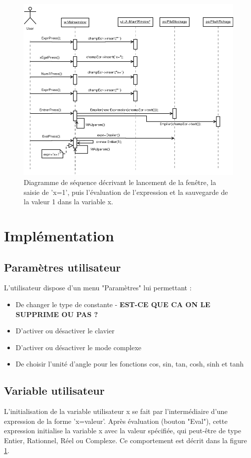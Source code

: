 \documentclass[a4paper,11pt]{article}
\begin{document}
\begin{figure}[H]
	\center
	\includegraphics[width=16.7cm]{diag_seq_2.png}
	\caption{Diagramme de séquence décrivant le lancement de la fenêtre, la saisie de 'x=1', puis l'évaluation de l'expression et la sauvegarde de la valeur 1 dans la variable x.}
	\label{Diagramme sequence x}
\end{figure}

\section{Implémentation}
\subsection{Paramètres utilisateur}
L'utilisateur dispose d'un menu "Paramètres" lui permettant :
\begin{itemize}
\item{De changer le type de constante - \textbf{EST-CE QUE CA ON LE SUPPRIME OU PAS ?}}
\item{D'activer ou désactiver le clavier}
\item{D'activer ou désactiver le mode complexe}
\item{De choisir l'unité d'angle pour les fonctions cos, sin, tan, cosh, sinh et tanh}
\end{itemize}

\subsection{Variable utilisateur}
L'initialisation de la variable utilisateur x se fait par l'intermédiaire d'une expression de la forme 'x=valeur'. Après évaluation (bouton "Eval"), cette expression initialise la variable x avec la valeur spécifiée, qui peut-être de type Entier, Rationnel, Réel ou Complexe. Ce comportement est décrit dans la figure \ref{Diagramme sequence x}.
\end{document}
